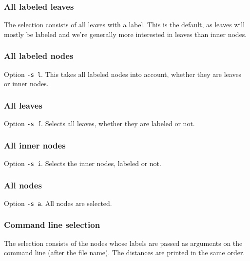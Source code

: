 \subsubsection{All labeled leaves}

The selection consists of all leaves with a label. This is the default, as
leaves will mostly be labeled and we're generally more interested in leaves
than inner nodes.



\subsubsection{All labeled nodes}

Option \texttt{-s l}. This takes all labeled nodes into account, whether they are leaves or inner nodes.



\subsubsection{All leaves}

Option \texttt{-s f}. Selects all leaves, whether they are
labeled or not.



\subsubsection{All inner nodes}

Option \texttt{-s i}. Selects the inner nodes, labeled or not.



\subsubsection{All nodes}

Option \texttt{-s a}. All nodes are selected.



\subsubsection{Command line selection}

The selection consists of the nodes whose labels are passed as arguments on the
command line (after the file name). The distances are printed in the same
order.




